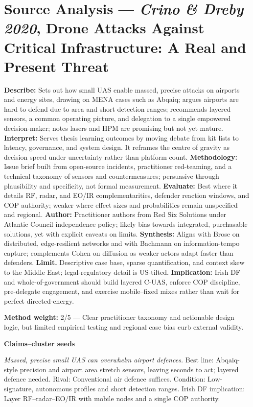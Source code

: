 \section*{Source Analysis — \textit{Crino & Dreby 2020}, Drone Attacks Against Critical Infrastructure: A Real and Present Threat}
\textbf{Describe:} Sets out how small UAS enable massed, precise attacks on airports and energy sites, drawing on MENA cases such as Abqaiq; argues airports are hard to defend due to area and short detection ranges; recommends layered sensors, a common operating picture, and delegation to a single empowered decision-maker; notes lasers and HPM are promising but not yet mature.
\textbf{Interpret:} Serves thesis learning outcomes by moving debate from kit lists to latency, governance, and system design. It reframes the centre of gravity as decision speed under uncertainty rather than platform count.
\textbf{Methodology:} Issue brief built from open-source incidents, practitioner red-teaming, and a technical taxonomy of sensors and countermeasures; persuasive through plausibility and specificity, not formal measurement.
\textbf{Evaluate:} Best where it details RF, radar, and EO/IR complementarities, defender reaction windows, and COP authority; weaker where effect sizes and probabilities remain unspecified and regional.
\textbf{Author:} Practitioner authors from Red Six Solutions under Atlantic Council independence policy; likely bias towards integrated, purchasable solutions, yet with explicit caveats on limits.
\textbf{Synthesis:} Aligns with Brose on distributed, edge-resilient networks and with Bachmann on information-tempo capture; complements Cohen on diffusion as weaker actors adapt faster than defenders.
\textbf{Limit.} Descriptive case base, sparse quantification, and context skew to the Middle East; legal-regulatory detail is US-tilted.
\textbf{Implication:} Irish DF and whole-of-government should build layered C-UAS, enforce COP discipline, pre-delegate engagement, and exercise mobile–fixed mixes rather than wait for perfect directed-energy.

\textbf{Method weight:} 2/5 — Clear practitioner taxonomy and actionable design logic, but limited empirical testing and regional case bias curb external validity.

\textbf{Claims–cluster seeds}

\textit{Massed, precise small UAS can overwhelm airport defences.} Best line: Abqaiq-style precision and airport area stretch sensors, leaving seconds to act; layered defence needed. Rival: Conventional air defence suffices. Condition: Low-signature, autonomous profiles and short detection ranges. Irish DF implication: Layer RF–radar–EO/IR with mobile nodes and a single COP authority.

